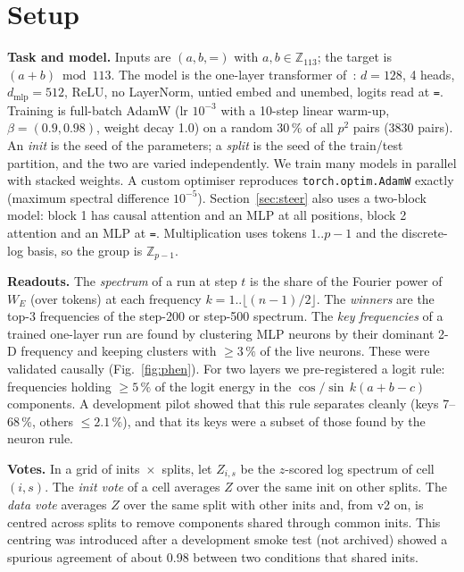 \documentclass[10pt]{article}
\begin{document}
\section{Setup}
\label{sec:setup}
\textbf{Task and model.} Inputs are $(a,b,\texttt{=})$ with $a,b\in\mathbb{Z}_{113}$; the target is $(a+b)\bmod 113$. The
model is the one-layer transformer of~\citet{nanda2023progress}: $d=128$, 4 heads, $d_{\text{mlp}}=512$, ReLU, no LayerNorm,
untied embed and unembed, logits read at \texttt{=}. Training is full-batch AdamW (lr $10^{-3}$ with a 10-step linear
warm-up, $\beta=(0.9,0.98)$, weight decay 1.0) on a random 30\,\% of all $p^2$ pairs (3830 pairs). An \emph{init} is the
seed of the parameters; a \emph{split} is the seed of the train/test partition, and the two are varied independently. We
train many models in parallel with stacked weights. A custom optimiser reproduces \texttt{torch.optim.AdamW} exactly
(maximum spectral difference $10^{-5}$). Section~\ref{sec:steer} also uses a two-block model: block 1 has causal attention
and an MLP at all positions, block 2 attention and an MLP at \texttt{=}. Multiplication uses tokens $1..p{-}1$ and the
discrete-log basis, so the group is $\mathbb{Z}_{p-1}$.

\textbf{Readouts.} The \emph{spectrum} of a run at step $t$ is the share of the Fourier power of $W_E$ (over tokens) at each
frequency $k=1..\lfloor (n-1)/2\rfloor$. The \emph{winners} are the top-3 frequencies of the step-200 or step-500 spectrum.
The \emph{key frequencies} of a trained one-layer run are found by clustering MLP neurons by their dominant 2-D frequency
and keeping clusters with $\ge 3\,\%$ of the live neurons. These were validated causally (Fig.~\ref{fig:phen}). For two
layers we pre-registered a logit rule: frequencies holding $\ge 5\,\%$ of the logit energy in the
$\cos/\sin\,k(a+b-c)$ components. A development pilot showed that this rule separates cleanly (keys 7--68\,\%, others
$\le 2.1\,\%$), and that its keys were a subset of those found by the neuron rule.

\textbf{Votes.} In a grid of inits~$\times$~splits, let $Z_{i,s}$ be the $z$-scored log spectrum of cell $(i,s)$. The
\emph{init vote} of a cell averages $Z$ over the same init on other splits. The \emph{data vote} averages $Z$ over the same
split with other inits and, from v2 on, is centred across splits to remove components shared through common inits. This
centring was introduced after a development smoke test (not archived) showed a spurious agreement of about 0.98 between two
conditions that shared inits.
\end{document}
